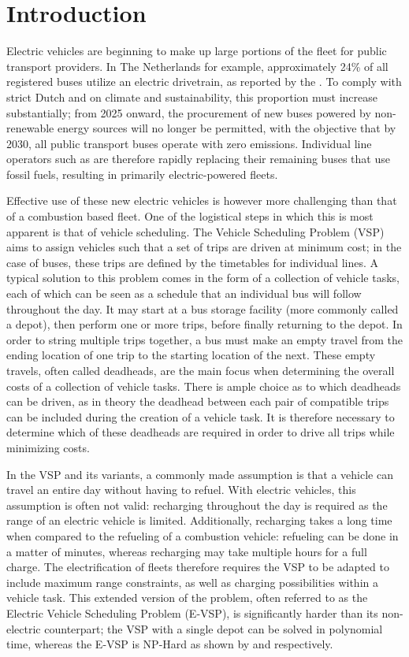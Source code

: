 \documentclass[]{article}
\begin{document}
\section{Introduction}
Electric vehicles are beginning to make up large portions of the fleet for public transport providers. In The Netherlands for example, approximately 24\% of all registered buses utilize an electric drivetrain, as reported by the \citet{RDW}. To comply with strict Dutch and \citet{europaRegulation20181999} on climate and sustainability, this proportion must increase substantially; from 2025 onward, the procurement of new buses powered by non-renewable energy sources will no longer be permitted, with the objective that by 2030, all public transport buses operate with zero emissions. Individual line operators such as \citet{qbuzzQbuzz} are therefore rapidly replacing their remaining buses that use fossil fuels, resulting in primarily electric-powered fleets.

Effective use of these new electric vehicles is however more challenging than that of a combustion based fleet. One of the logistical steps in which this is most apparent is that of vehicle scheduling. The Vehicle Scheduling Problem (VSP) aims to assign vehicles such that a set of trips are driven at minimum cost; in the case of buses, these trips are defined by the timetables for individual lines. A typical solution to this problem comes in the form of a collection of vehicle tasks, each of which can be seen as a schedule that an individual bus will follow throughout the day. It may start at a bus storage facility (more commonly called a depot), then perform one or more trips, before finally returning to the depot. In order to string multiple trips together, a bus must make an empty travel from the ending location of one trip to the starting location of the next. These empty travels, often called deadheads, are the main focus when determining the overall costs of a collection of vehicle tasks. There is ample choice as to which deadheads can be driven, as in theory the deadhead between each pair of compatible trips can be included during the creation of a vehicle task. It is therefore necessary to determine which of these deadheads are required in order to drive all trips while minimizing costs.

In the VSP and its variants, a commonly made assumption is that a vehicle can travel an entire day without having to refuel. With electric vehicles, this assumption is often not valid: recharging throughout the day is required as the range of an electric vehicle is limited. Additionally, recharging takes a long time when compared to the refueling of a combustion vehicle: refueling can be done in a matter of minutes, whereas recharging may take multiple hours for a full charge. The electrification of fleets therefore requires the VSP to be adapted to include maximum range constraints, as well as charging possibilities within a vehicle task. This extended version of the problem, often referred to as the Electric Vehicle Scheduling Problem (E-VSP), is significantly harder than its non-electric counterpart; the VSP with a single depot can be solved in polynomial time, whereas the E-VSP is NP-Hard as shown by \citet{Bunte2009} and \citet{Sassi2014} respectively.
\end{document}
